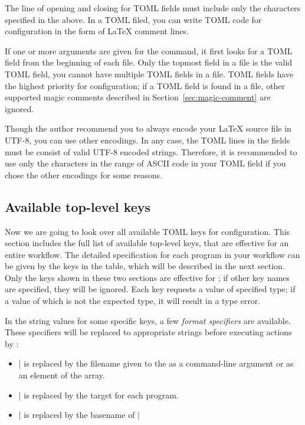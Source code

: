 \documentclass[draft]{llmk-doc}
\begin{document}
The line of opening and closing for TOML fields must include only the
characters specified in the above. In a TOML filed, you can write TOML code for
 configuration in the form of {\LaTeX} comment lines.
%
\begin{htcode}
\end{htcode}

If one or more arguments are given for the  command, it first looks
for a TOML field from the beginning of each file. Only the topmost field in a
file is the valid TOML field, \ie you cannot have multiple TOML fields in a
file. TOML fields have the highest priority for  configuration; if a
TOML field is found in a file, other supported magic comments described in
Section~\ref{sec:magic-comment} are ignored.

Though the author recommend you to always encode your {\LaTeX} source file in
UTF-8, you can use other encodings. In any case, the TOML lines in the fields
must be consist of valid UTF-8 encoded strings. Therefore, it is recommended to
use only the characters in the range of ASCII code in your TOML field if you
chose the other encodings for some reasons.

\subsection{Available top-level keys}
\label{sec:top-level-keys}

Now we are going to look over all available TOML keys for 
configuration. This section includes the full list of available top-level keys,
that are effective for an entire workflow. The detailed specification for each
program in your workflow can be given by the keys in the  table,
which will be described in the next section. Only the keys shown in these two
sections are effective for ; if other key names are specified, they
will be ignored. Each key requests a value of specified type; if a value of
which is not the expected type, it will result in a type error.

In the string values for some specific keys, a few \emph{format specifiers} are
available. These specifiers will be replaced to appropriate strings before
executing actions by :
%
\begin{itemize}
\item |%
  is replaced by the filename given to the  as a command-line
  argument or as an element of the  array.
\item |%
  is replaced by the target for each program.
\item |%
  is replaced by the basename of |%
\end{itemize}
\end{document}
